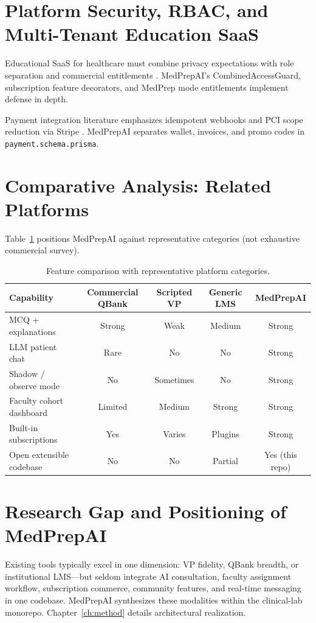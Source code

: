 \section{Platform Security, RBAC, and Multi-Tenant Education SaaS}
Educational SaaS for healthcare must combine privacy expectations with role separation and commercial entitlements \cite{fowler_patterns_2002}. MedPrepAI's CombinedAccessGuard, subscription feature decorators, and MedPrep mode entitlements implement defense in depth.

Payment integration literature emphasizes idempotent webhooks and PCI scope reduction via Stripe \cite{stripe_docs}. MedPrepAI separates wallet, invoices, and promo codes in \texttt{payment.schema.prisma}.

\section{Comparative Analysis: Related Platforms}
Table~\ref{tab:related-platforms} positions MedPrepAI against representative categories (not exhaustive commercial survey).

\begin{table}[htbp]
  \centering
  \caption{Feature comparison with representative platform categories.}
  \label{tab:related-platforms}
  \footnotesize
  \begin{tabular}{@{}lcccc@{}}
    \toprule
    \textbf{Capability} & \textbf{Commercial QBank} & \textbf{Scripted VP} & \textbf{Generic LMS} & \textbf{MedPrepAI} \\
    \midrule
    MCQ + explanations & Strong & Weak & Medium & Strong \\
    LLM patient chat & Rare & No & No & Strong \\
    Shadow / observe mode & No & Sometimes & No & Strong \\
    Faculty cohort dashboard & Limited & Medium & Strong & Strong \\
    Built-in subscriptions & Yes & Varies & Plugins & Strong \\
    Open extensible codebase & No & No & Partial & Yes (this repo) \\
    \bottomrule
  \end{tabular}
\end{table}

\section{Research Gap and Positioning of MedPrepAI}
Existing tools typically excel in one dimension: VP fidelity, QBank breadth, or institutional LMS---but seldom integrate AI consultation, faculty assignment workflow, subscription commerce, community features, and real-time messaging in one codebase. MedPrepAI synthesizes these modalities within the clinical-lab monorepo. Chapter~\ref{ch:method} details architectural realization.
